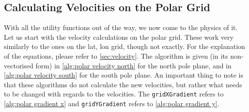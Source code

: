 \subsection{Calculating Velocities on the Polar Grid}
With all the utility functions out of the way, we now come to the physics of it. Let us start with the velocity calculations on the polar grid. These work very similarly to the ones on the lat, 
lon grid, though not exactly. For the explanation of the equations, please refer to \autoref{sec:velocity}. The algorithm is given (in its non-vectorised form) in 
\autoref{alg:polar velocity north} for the north pole plane, and in \autoref{alg:polar velocity south} for the south pole plane. An important thing to note is that these algorithms do not 
calculate the new velocities, but rather what needs to be changed with regards to the velocities. The \texttt{gridXGradient} refers to \autoref{alg:polar gradient x} and \texttt{gridYGradient} 
refers to \autoref{alg:polar gradient y}.

